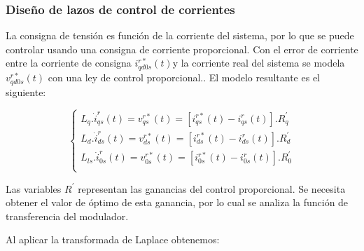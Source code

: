 \documentclass{article}
\begin{document}



\subsubsection{Diseño de lazos de control de corrientes}

La consigna de tensión es función de la corriente del sistema, por lo que se puede controlar usando 
una consigna de corriente proporcional. Con el error de corriente entre la corriente de consigna 
$i_{qd0s}^{r*}(t)$y la corriente real del sistema se modela $v_{qd0s}^{r*}(t)$ con una ley de 
control proporcional.. El modelo resultante es el siguiente:

\begin{equation}
    \begin{cases}
        L_q. \dot{i}_{qs}^r(t) = v^{r*}_{qs}(t) = [i_{qs}^{r*}(t) - i_{qs}^r(t)].R_q^\prime \\
        L_d. \dot{i}_{ds}^r(t) = v^{r*}_{ds}(t) = [i_{ds}^{r*}(t) - i_{ds}^r(t)].R_d^\prime \\
        L_{ls}. \dot{i}_{0s}^r(t) = v^{r*}_{0s}(t) = [i_{0s}^{r*}(t) - i_{0s}^r(t)].R_{0}^\prime \\
    \end{cases}
\end{equation}

Las variables $R^\prime$ representan las ganancias del control proporcional. Se necesita obtener 
el valor de óptimo de esta ganancia, por lo cual se analiza la función de transferencia del modulador.

Al aplicar la transformada de Laplace obtenemos:
\end{document}
